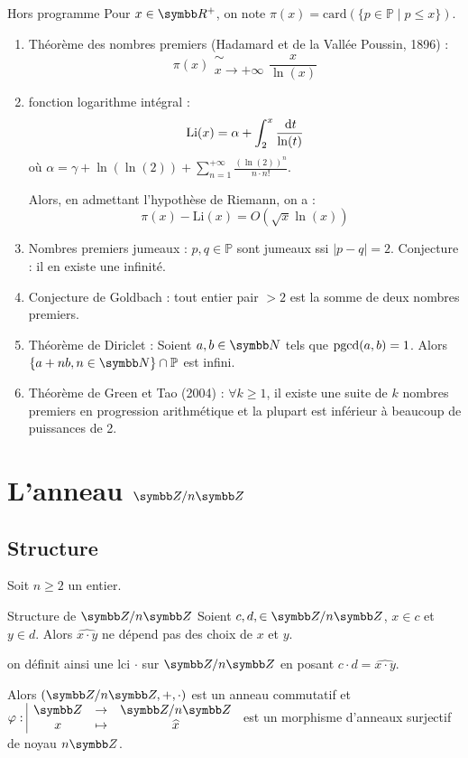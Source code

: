 \begin{proposition}{Hors programme}{}
    Pour $x \in \R^+$, on note $\pi(x) = \text{card}(\{p \in \mathbb{P} \mid p \leqslant x\})$.

    \begin{enumerate}
        \item Théorème des nombres premiers (Hadamard et de la Vallée Poussin, 1896) :
        \[\pi(x) \substack{\sim \\ x \to + \infty} \frac x {\ln(x)}\]
        \item fonction logarithme intégral : 
        \[\mathrm{Li}(x) = \alpha + \int_2^x \frac {\,\mathrm{d}t}{\ln(t)}\]
        où $\displaystyle \alpha = \gamma + \ln(\ln(2)) + \sum_{n = 1}^{+\infty} \frac{(\ln(2))^n}{n \cdot n!}$. 

        Alors, en admettant l'hypothèse de Riemann, on a : 
        \[\pi(x)  - \mathrm{Li}(x) = O(\sqrt x \ln(x))\]
        \item Nombres premiers jumeaux : $p, q \in \mathbb P$ sont jumeaux ssi $|p - q| = 2$. 
        Conjecture : il en existe une infinité. 
        \item Conjecture de Goldbach : tout entier pair $> 2$ est la somme de deux nombres premiers.
    
        \item Théorème de Diriclet : Soient $a, b \in \N$ tels que $\operatorname{pgcd}(a, b) = 1$. Alors 
        $\{a + nb, n \in \N\} \cap \mathbb P$ est infini.
        \item Théorème de Green et Tao (2004) : $\forall k \geqslant 1$, il existe une suite de $k$ nombres premiers 
        en progression arithmétique et la plupart est inférieur à beaucoup de puissances de 2.
    \end{enumerate}
     
\end{proposition}

\section{L'anneau \texorpdfstring{$\Z / n \Z$}{Z/nZ}}
\subsection{Structure}

Soit $n \geqslant 2$ un entier.

\begin{theoreme}{Structure de $\Z / n \Z$}{}
    Soient $c, d, \in \Z/ n \Z$, $x \in c $ et $y \in d$. Alors 
    $\widehat{x \cdot y}$ ne dépend pas des choix de $x$ et $y$.

    on définit ainsi une lci $\cdot$ sur $\Z / n \Z$  en posant $c \cdot d = \widehat{x \cdot y}$.

    Alors $(\Z / n \Z, +, \cdot)$ est un anneau commutatif et $\fonction{\varphi}{\Z}{\Z / n \Z}{x}{\widehat x}$ est un morphisme d'anneaux
    surjectif de noyau $n \Z$.
\end{theoreme}


